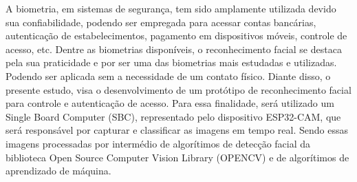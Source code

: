 
\begin{resumoutfpr}%

A biometria, em sistemas de segurança, tem sido amplamente utilizada devido sua 
confiabilidade, podendo ser empregada para acessar contas bancárias, autenticação de 
estabelecimentos, pagamento em dispositivos móveis, controle de acesso, etc. 
Dentre as biometrias disponíveis, o reconhecimento facial se destaca pela sua 
praticidade e por ser uma das biometrias mais estudadas e utilizadas. 
Podendo ser aplicada sem a necessidade de um contato físico. Diante disso, 
o presente estudo, visa o desenvolvimento de um protótipo de 
reconhecimento facial para controle e autenticação de acesso. Para essa finalidade, 
será utilizado um Single Board Computer (SBC), representado pelo dispositivo 
ESP32-CAM, que será responsável por capturar e classificar as imagens em tempo 
real. Sendo essas imagens processadas por intermédio de algorítimos de detecção facial 
da biblioteca Open Source Computer Vision Library (OPENCV) e de algorítimos 
de aprendizado de máquina.
\end{resumoutfpr}

